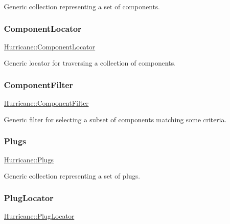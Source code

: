 Generic collection representing a set of components. \mbox{\label{namespaceHurricane_ad72b1998a4ff6e68326469dec9887f4d}} 
\subsubsection{\texorpdfstring{Component\+Locator}{ComponentLocator}}
{\footnotesize\ttfamily \hyperlink{namespaceHurricane_ad72b1998a4ff6e68326469dec9887f4d}{Hurricane\+::\+Component\+Locator}}

Generic locator for traversing a collection of components. \mbox{\label{namespaceHurricane_acbfacb3aada84aa054e587817f204e90}} 
\subsubsection{\texorpdfstring{Component\+Filter}{ComponentFilter}}
{\footnotesize\ttfamily \hyperlink{namespaceHurricane_acbfacb3aada84aa054e587817f204e90}{Hurricane\+::\+Component\+Filter}}

Generic filter for selecting a subset of components matching some criteria. \mbox{\label{namespaceHurricane_ac8335d2057483ee7a935c15a9460c64f}} 
\subsubsection{\texorpdfstring{Plugs}{Plugs}}
{\footnotesize\ttfamily \hyperlink{namespaceHurricane_ac8335d2057483ee7a935c15a9460c64f}{Hurricane\+::\+Plugs}}

Generic collection representing a set of plugs. \mbox{\label{namespaceHurricane_a99a5e89f593de242e24a24b632b0534e}} 
\subsubsection{\texorpdfstring{Plug\+Locator}{PlugLocator}}
{\footnotesize\ttfamily \hyperlink{namespaceHurricane_a99a5e89f593de242e24a24b632b0534e}{Hurricane\+::\+Plug\+Locator}}

